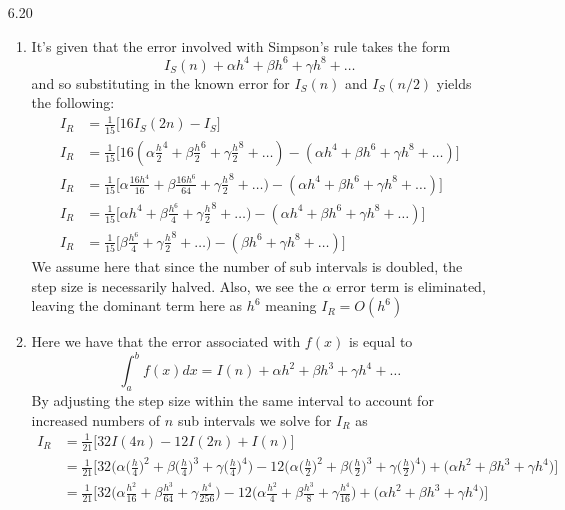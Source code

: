 \documentclass[11pt,a4paper]{article}
\begin{document}
\begin{itemize}
			\item[6.20]
				\begin{enumerate} [label={\alph*)}]
					\item It's given that the error involved with Simpson's rule takes the form
					$$I_S(n) + \alpha h^4 + \beta h^6 + \gamma h^8 + \dots$$
					and so substituting in the known error for $I_S(n)$ and $I_S(n/2)$ yields the following:
					\begin{align*}
						I_R &= \frac{1}{15}\Big[ 16I_S(2n)-I_S\Big] \\
						I_R &= \frac{1}{15}\Big[ 16(\alpha\frac{h}{2}^4 + \beta\frac{h}{2}^6 + \gamma\frac{h}{2}^8+\dots) - (\alpha h^4 + \beta h^6 + \gamma h^8+\dots)\Big] \\
						I_R &= \frac{1}{15}\Big[ \alpha\frac{16h^4}{16} + \beta\frac{16h^6}{64} + \gamma\frac{h}{2}^8+\dots) - (\alpha h^4 + \beta h^6 + \gamma h^8+\dots)\Big] \\
						I_R &= \frac{1}{15}\Big[ \alpha h^4 + \beta\frac{h^6}{4} + \gamma\frac{h}{2}^8+\dots) - (\alpha h^4 + \beta h^6 + \gamma h^8+\dots)\Big] \\ 
						I_R &= \frac{1}{15}\Big[ \beta\frac{h^6}{4} + \gamma\frac{h}{2}^8+\dots) - (\beta h^6 + \gamma h^8+\dots)\Big]
					\end{align*}
					We assume here that since the number of sub intervals is doubled, the step size is necessarily halved. Also, we see the $\alpha$ error term is eliminated, leaving the dominant term here as $h^6$ meaning $I_R = O(h^6)$
					\item Here we have that the error associated with $f(x)$ is equal to $$\int_a^b f(x)dx = I(n) + \alpha h^2 + \beta h^3 + \gamma h^4 + \dots$$
					By adjusting the step size within the same interval to account for increased numbers of $n$ sub intervals we solve for $I_R$ as
					\begin{align*}
						I_R &= \frac{1}{21}\Big[32I(4n) - 12I(2n) + I(n)\Big] \\
						&= \frac{1}{21}\Big[32\Big(\alpha \big( \frac{h}{4}\big)^2 + \beta\big(\frac{h}{4}\big)^3 + \gamma\big(\frac{h}{4}\big)^4\Big) - 12\Big(\alpha\big(\frac{h}{2}\big)^2 + \beta\big(\frac{h}{2}\big)^3 + \gamma\big(\frac{h}{2}\big)^4\Big) + \Big(\alpha h^2 + \beta h^3 + \gamma h^4\Big)\Big] \\
						&= \frac{1}{21}\Big[32\Big(\alpha \frac{h^2}{16} + \beta\frac{h^3}{64} + \gamma\frac{h^4}{256}\Big) - 12\Big(\alpha\frac{h^2}{4} + \beta\frac{h^3}{8} + \gamma\frac{h^4}{16}\Big) + \Big(\alpha h^2 + \beta h^3 + \gamma h^4\Big)\Big] \\

\end{align*}
\end{enumerate}
\end{itemize}
\end{document}
